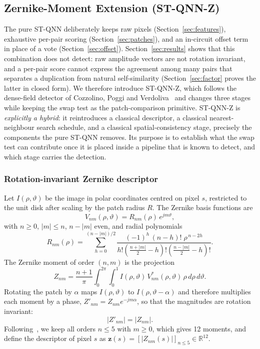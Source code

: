 \documentclass[conference]{IEEEtran}
\begin{document}
\subsection{Zernike-Moment Extension (ST-QNN-Z)}\label{sec:zernike}
The pure ST-QNN deliberately keeps raw pixels (Section~\ref{sec:features}), exhaustive per-pair scoring (Section~\ref{sec:patches}), and an in-circuit offset term in place of a vote (Section~\ref{sec:offset}). Section~\ref{sec:results} shows that this combination does not detect: raw amplitude vectors are not rotation invariant, and a per-pair score cannot express the agreement among many pairs that separates a duplication from natural self-similarity (Section~\ref{sec:factor} proves the latter in closed form). We therefore introduce ST-QNN-Z, which follows the dense-field detector of Cozzolino, Poggi and Verdoliva~\cite{cozzolino2015} and changes three stages while keeping the swap test as the patch-comparison primitive. ST-QNN-Z is \emph{explicitly a hybrid}: it reintroduces a classical descriptor, a classical nearest-neighbour search schedule, and a classical spatial-consistency stage, precisely the components the pure ST-QNN removes. Its purpose is to establish what the swap test can contribute once it is placed inside a pipeline that is known to detect, and which stage carries the detection.

\subsubsection{Rotation-invariant Zernike descriptor}
Let $I(\rho,\vartheta)$ be the image in polar coordinates centred on pixel $s$, restricted to the unit disk after scaling by the patch radius $R$. The Zernike basis functions are
\begin{equation}
V_{nm}(\rho,\vartheta) = R_{nm}(\rho)\,e^{jm\vartheta},
\label{eq:zbasis}
\end{equation}
with $n\ge 0$, $|m|\le n$, $n-|m|$ even, and radial polynomials
\begin{equation}
R_{nm}(\rho) = \sum_{h=0}^{(n-|m|)/2} \frac{(-1)^h\,(n-h)!\;\rho^{\,n-2h}}{h!\left(\frac{n+|m|}{2}-h\right)!\left(\frac{n-|m|}{2}-h\right)!}.
\label{eq:zradial}
\end{equation}
The Zernike moment of order $(n,m)$ is the projection~\cite{teague1980}
\begin{equation}
Z_{nm} = \frac{n+1}{\pi}\int_0^{2\pi}\!\!\int_0^1 I(\rho,\vartheta)\,V_{nm}^*(\rho,\vartheta)\,\rho\,d\rho\,d\vartheta .
\label{eq:zmoment}
\end{equation}
Rotating the patch by $\alpha$ maps $I(\rho,\vartheta)$ to $I(\rho,\vartheta-\alpha)$ and therefore multiplies each moment by a phase, $Z'_{nm} = Z_{nm}e^{-jm\alpha}$, so that the magnitudes are rotation invariant:
\begin{equation}
|Z'_{nm}| = |Z_{nm}|.
\label{eq:zinv}
\end{equation}
Following~\cite{cozzolino2015}, we keep all orders $n\le 5$ with $m\ge 0$, which gives 12 moments, and define the descriptor of pixel $s$ as $\mathbf{z}(s) = \left[|Z_{nm}(s)|\right]_{n\le5}\in\mathbb{R}^{12}$.
\end{document}
